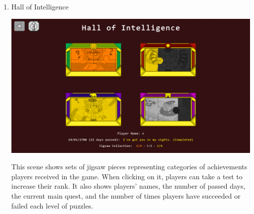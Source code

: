 \documentclass[12pt,oneside,openright,a4paper]{cpe-english-project}
\begin{document}
\begin{enumerate}
	\item Hall of Intelligence \\
	\begin{minipage}[c]{\textwidth}\centering
	\includegraphics[width=14cm]{figure/screenshot/screenshot-HoI.png}
	\end{minipage}
	This scene shows sets of jigsaw pieces representing categories of achievements players received in the game. When clicking on it, players can take a test to increase their rank. It also shows players’ names, the number of passed days, the current main quest, and the number of times players have succeeded or failed each level of puzzles.


\end{enumerate}
\end{document}
